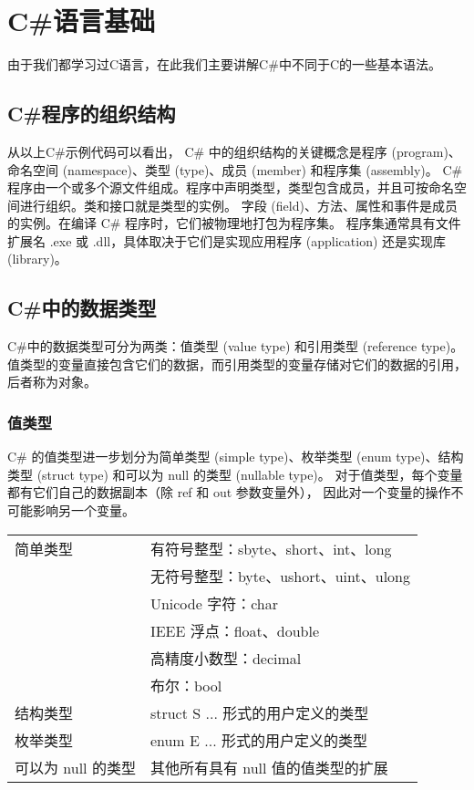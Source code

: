 ﻿%

\chapter{C\#语言基础}

由于我们都学习过C语言，在此我们主要讲解C\#中不同于C的一些基本语法。

\section{ C\#程序的组织结构}

 从以上C\#示例代码可以看出，
 C\# 中的组织结构的关键概念是程序 (program)、命名空间 (namespace)、类型 (type)、成员 (member) 和程序集 (assembly)。
 C\# 程序由一个或多个源文件组成。程序中声明类型，类型包含成员，并且可按命名空间进行组织。类和接口就是类型的实例。
 字段 (field)、方法、属性和事件是成员的实例。在编译 C\# 程序时，它们被物理地打包为程序集。
 程序集通常具有文件扩展名 .exe 或 .dll，具体取决于它们是实现应用程序 (application) 还是实现库 (library)。

\section{C\#中的数据类型}
C\#中的数据类型可分为两类：值类型 (value type) 和引用类型 (reference type)。
值类型的变量直接包含它们的数据，而引用类型的变量存储对它们的数据的引用，后者称为对象。

\subsection{值类型}
C\# 的值类型进一步划分为简单类型 (simple type)、枚举类型 (enum type)、结构类型 (struct type) 
和可以为 null 的类型 (nullable type)。
对于值类型，每个变量都有它们自己的数据副本（除 ref 和 out 参数变量外），
因此对一个变量的操作不可能影响另一个变量。

\begin{tabular}{|l|l|}
\hline
简单类型   & 有符号整型：sbyte、short、int、long \\
                    & 无符号整型：byte、ushort、uint、ulong \\
                    & Unicode 字符：char \\
                   &  IEEE 浮点：float、double \\
                    & 高精度小数型：decimal \\
                    & 布尔：bool \\
\hline
结构类型 & struct S {...} 形式的用户定义的类型 \\
枚举类型  & enum E {...} 形式的用户定义的类型 \\
可以为 null 的类型 & 其他所有具有 null 值的值类型的扩展 \\
\hline
\end{tabular}


